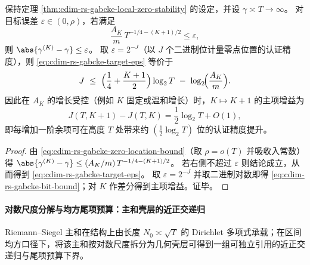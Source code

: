 \begin{theorem}[层级余项阶与二进制认证精度的增益律]\label{thm:cdim-rs-gabcke-bit-gain}
保持定理 \ref{thm:cdim-rs-gabcke-local-zero-stability} 的设定，并设 \(\gamma\asymp T\to\infty\)。
对目标误差 \(\varepsilon\in(0,\rho)\)，若满足
\begin{equation}\label{eq:cdim-rs-gabcke-target-eps}
\frac{A_K}{m}\,T^{-1/4-(K+1)/2}\le \varepsilon,
\end{equation}
则 \(\abs{\gamma^{(K)}-\gamma}\le \varepsilon\)。
取 \(\varepsilon=2^{-J}\)（以 \(J\) 个二进制位计量零点位置的认证精度），则 \eqref{eq:cdim-rs-gabcke-target-eps} 等价于
\begin{equation}\label{eq:cdim-rs-gabcke-bit-bound}
J\ \le\ \Bigl(\frac14+\frac{K+1}{2}\Bigr)\log_2 T\ -\ \log_2\!\Bigl(\frac{A_K}{m}\Bigr).
\end{equation}
因此在 \(A_K\) 的增长受控（例如 \(K\) 固定或温和增长）时，\(K\mapsto K+1\) 的主项增益为
\[
J(T,K+1)-J(T,K)=\frac12\log_2 T+O(1),
\]
即每增加一阶余项可在高度 \(T\) 处带来约 \((\tfrac12\log_2 T)\) 位的认证精度提升。
\end{theorem}
\begin{proof}
由 \eqref{eq:cdim-rs-gabcke-zero-location-bound}（取 \(\rho=o(T)\) 并吸收入常数）得
\(
\abs{\gamma^{(K)}-\gamma}\le (A_K/m)\,T^{-1/4-(K+1)/2}
\)。
若右侧不超过 \(\varepsilon\) 则结论成立，从而得到 \eqref{eq:cdim-rs-gabcke-target-eps}。
取 \(\varepsilon=2^{-J}\) 并取二进制对数即得 \eqref{eq:cdim-rs-gabcke-bit-bound}；对 \(K\) 作差分得到主项增益。证毕。
\end{proof}

\paragraph{对数尺度分解与均方尾项预算：主和壳层的近正交递归}
Riemann--Siegel 主和在结构上由长度 \(N_0\asymp \sqrt{T}\) 的 Dirichlet 多项式承载；在区间均方口径下，将该主和按对数尺度拆分为几何壳层可得到一组可独立引用的近正交递归与尾项预算下界。

